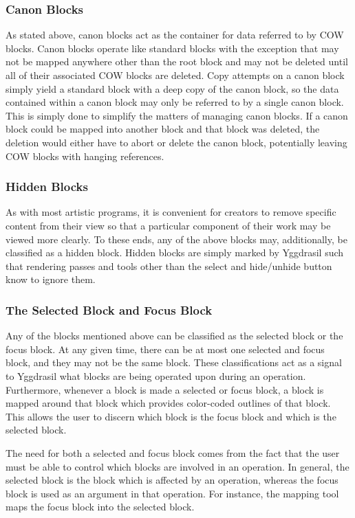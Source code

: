 \documentclass[onecolumn, draftclsnofoot,10pt, compsoc]{IEEEtran}
\begin{document}
\subsubsection{Canon Blocks}

As stated above, canon blocks act as the container for data referred to by COW blocks. Canon blocks operate like standard blocks with the exception that may not be mapped anywhere other than the root block and may not be deleted until all of their associated COW blocks are deleted. Copy attempts on a canon block simply yield a standard block with a deep copy of the canon block, so the data contained within a canon block may only be referred to by a single canon block. This is simply done to simplify the matters of managing canon blocks. If a canon block could be mapped into another block and that block was deleted, the deletion would either have to abort or delete the canon block, potentially leaving COW blocks with hanging references.

\subsubsection{Hidden Blocks}

As with most artistic programs, it is convenient for creators to remove specific content from their view so that a particular component of their work may be viewed more clearly. To these ends, any of the above blocks may, additionally, be classified as a hidden block. Hidden blocks are simply marked by Yggdrasil such that rendering passes and tools other than the select and hide/unhide button know to ignore them. 

\subsubsection{The Selected Block and Focus Block}

Any of the blocks mentioned above can be classified as the selected block or the focus block. At any given time, there can be at most one selected and focus block, and they may not be the same block. These classifications act as a signal to Yggdrasil what blocks are being operated upon during an operation. Furthermore, whenever a block is made a selected or focus block, a block is mapped around that block which provides color-coded outlines of that block. This allows the user to discern which block is the focus block and which is the selected block.

The need for both a selected and focus block comes from the fact that the user must be able to control which blocks are involved in an operation. In general, the selected block is the block which is affected by an operation, whereas the focus block is used as an argument in that operation. For instance, the mapping tool maps the focus block into the selected block.
\end{document}
